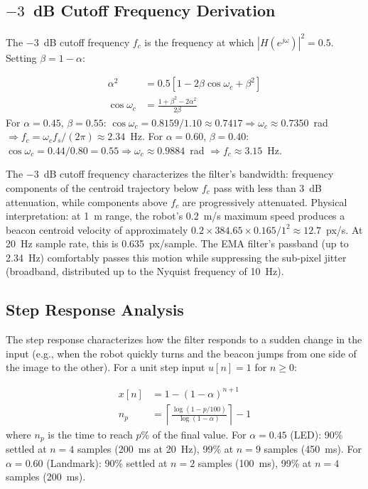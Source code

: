 \subsection{\texorpdfstring{$-3$}{-3}~dB Cutoff Frequency Derivation}

The $-3$~dB cutoff frequency $f_c$ is the frequency at which $|H(e^{j\omega})|^2 = 0.5$. Setting $\beta = 1-\alpha$:

\begin{eqblock}
\begin{align}
\alpha^2 &= 0.5\left[1 - 2\beta\cos\omega_c + \beta^2\right] \\
\cos\omega_c &= \frac{1+\beta^2-2\alpha^2}{2\beta}
\end{align}
For $\alpha=0.45$, $\beta=0.55$: $\cos\omega_c = 0.8159/1.10 \approx 0.7417 \Rightarrow \omega_c \approx 0.7350$~rad $\Rightarrow f_c = \omega_c f_s/(2\pi) \approx 2.34$~Hz.
For $\alpha=0.60$, $\beta=0.40$: $\cos\omega_c = 0.44/0.80 = 0.55 \Rightarrow \omega_c \approx 0.9884$~rad $\Rightarrow f_c \approx 3.15$~Hz.
\end{eqblock}

The $-3$~dB cutoff frequency characterizes the filter's bandwidth: frequency components of the centroid trajectory below $f_c$ pass with less than 3~dB attenuation, while components above $f_c$ are progressively attenuated. Physical interpretation: at 1~m range, the robot's 0.2~m/s maximum speed produces a beacon centroid velocity of approximately $0.2 \times 384.65 \times 0.165 / 1^2 \approx 12.7$~px/s. At 20~Hz sample rate, this is 0.635~px/sample. The EMA filter's passband (up to 2.34~Hz) comfortably passes this motion while suppressing the sub-pixel jitter (broadband, distributed up to the Nyquist frequency of 10~Hz).

\subsection{Step Response Analysis}

The step response characterizes how the filter responds to a sudden change in the input (e.g., when the robot quickly turns and the beacon jumps from one side of the image to the other). For a unit step input $u[n]=1$ for $n\geq0$:

\begin{eqblock}
\begin{align}
x[n] &= 1 - (1-\alpha)^{n+1} \\
n_p &= \left\lceil \frac{\log(1-p/100)}{\log(1-\alpha)} \right\rceil - 1
\end{align}
where $n_p$ is the time to reach $p\%$ of the final value. For $\alpha=0.45$ (LED): 90\% settled at $n=4$ samples (200~ms at 20~Hz), 99\% at $n=9$ samples (450~ms). For $\alpha=0.60$ (Landmark): 90\% settled at $n=2$ samples (100~ms), 99\% at $n=4$ samples (200~ms).
\end{eqblock}

